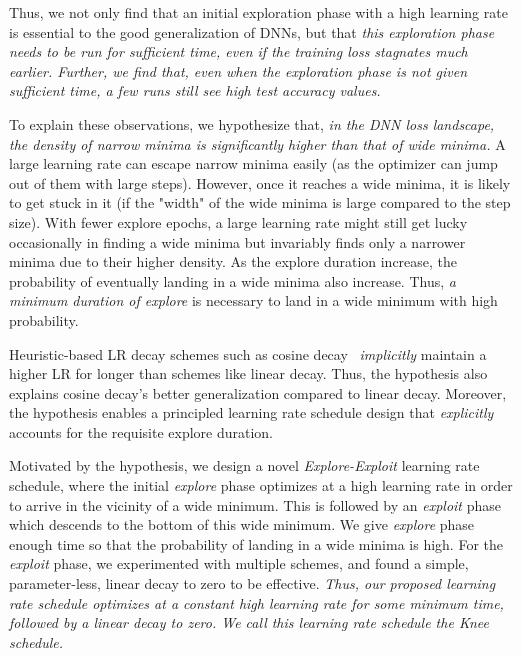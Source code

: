 \documentclass{article} \usepackage{iclr2021_conference,times}
\newcommand{\lrschedule}{\textit{Knee schedule}}
\begin{document}
Thus, we not only find that an initial exploration phase with a high learning rate is essential to the good generalization of DNNs, but that {\it this exploration phase needs to be run for sufficient time, even if the training loss stagnates much earlier. Further, we find that, even when the exploration phase is not given sufficient time, a few runs still see high test accuracy values.}




To explain these observations, we hypothesize that, {\it in the DNN loss landscape, the density of narrow minima is significantly higher than that of wide minima.} A large learning rate can escape narrow minima easily (as the optimizer can jump out of them with large steps). However, once it reaches a wide minima, it is likely to get stuck in it (if the "width" of the wide minima is large compared to the step size). With fewer explore epochs, a large learning rate might still get lucky occasionally in finding a wide minima but invariably finds only a narrower minima due to their higher density. As the explore duration increase, the probability of eventually landing in a wide minima also increase. Thus, {\it a minimum duration of explore} is necessary to land in a wide minimum with high probability. 

Heuristic-based LR decay schemes such as cosine decay~\citep{loshchilov2016sgdr} {\it implicitly} maintain a higher LR for longer than schemes like linear decay. Thus, the hypothesis also explains cosine decay's better generalization compared to linear decay. Moreover, the hypothesis enables a principled learning rate schedule design that {\it explicitly} accounts for the requisite explore duration. 

Motivated by the hypothesis, we design a novel {\it Explore-Exploit} learning rate schedule, where the initial \textit{explore} phase optimizes at a high learning rate in order to arrive in the vicinity of a wide minimum. This is followed by an \textit{exploit} phase which descends to the bottom of this wide minimum. We give {\it explore} phase enough time so that the probability of landing in a wide minima is high. For the \textit{exploit} phase, we experimented with multiple schemes, and found a simple, parameter-less, linear decay to zero to be effective. \textit{Thus, our proposed learning rate schedule optimizes at a constant high learning rate for some minimum time, followed by a linear decay to zero. We call this learning rate schedule the \lrschedule{}.} 
\end{document}
